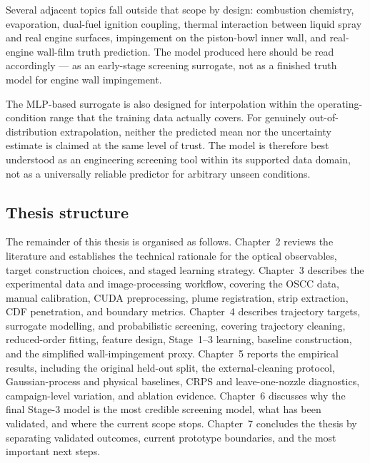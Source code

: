 Several adjacent topics fall outside that scope by design: combustion chemistry, evaporation, dual-fuel ignition coupling,
thermal interaction between liquid spray and real engine surfaces, impingement on the piston-bowl inner wall,
and real-engine wall-film truth prediction. The model produced here should be read accordingly
--- as an early-stage screening surrogate, not as a finished truth model for engine wall impingement.

The MLP-based surrogate is also designed for interpolation within the operating-condition range that
the training data actually covers. For genuinely out-of-distribution extrapolation,
neither the predicted mean nor the uncertainty estimate is claimed at the same level of trust.
The model is therefore best understood as an engineering screening tool within its supported data domain,
not as a universally reliable predictor for arbitrary unseen conditions.

\subsection{Thesis structure}

The remainder of this thesis is organised as follows. Chapter~2 reviews the literature and establishes the technical rationale for the optical observables, target construction choices, and staged learning strategy. Chapter~3 describes the experimental data and image-processing workflow, covering the OSCC data, manual calibration, CUDA preprocessing, plume registration, strip extraction, CDF penetration, and boundary metrics. Chapter~4 describes trajectory targets, surrogate modelling, and probabilistic screening, covering trajectory cleaning, reduced-order fitting, feature design, Stage~1--3 learning, baseline construction, and the simplified wall-impingement proxy. Chapter~5 reports the empirical results, including the original held-out split, the external-cleaning protocol, Gaussian-process and physical baselines, CRPS and leave-one-nozzle diagnostics, campaign-level variation, and ablation evidence. Chapter~6 discusses why the final Stage-3 model is the most credible screening model, what has been validated, and where the current scope stops. Chapter~7 concludes the thesis by separating validated outcomes, current prototype boundaries, and the most important next steps.


